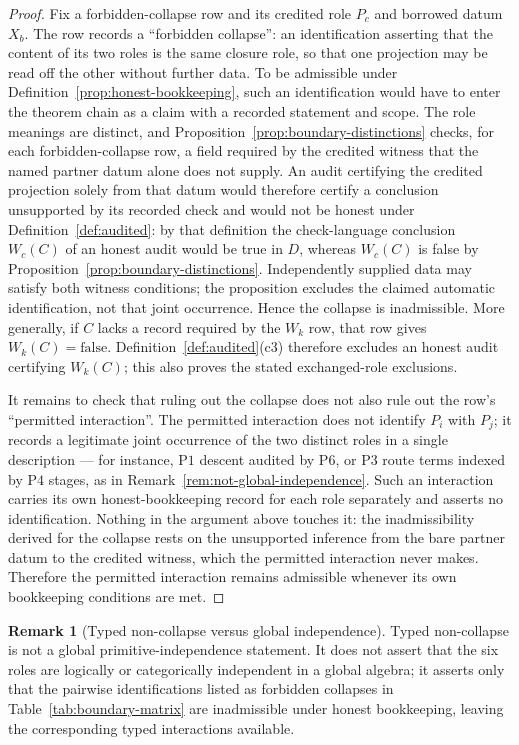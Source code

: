 \documentclass[11pt]{article}
\theoremstyle{definition}
\newtheorem{remark}[theorem]{Remark}
\newcommand{\Pone}{\ensuremath{\mathrm{P1}}}
\newcommand{\Pthree}{\ensuremath{\mathrm{P3}}}
\newcommand{\Pfour}{\ensuremath{\mathrm{P4}}}
\newcommand{\Psix}{\ensuremath{\mathrm{P6}}}
\begin{document}
\begin{proof}
Fix a forbidden-collapse row and its credited role \(P_c\) and borrowed datum \(X_b\). The row records a ``forbidden collapse'': an
identification asserting that the content of its two roles is the same
closure role, so that one
projection may be read off the other without further data. To be
admissible under Definition~\ref{prop:honest-bookkeeping}, such an
identification would have to enter the theorem chain as a claim with a
recorded statement and scope. The role meanings are distinct, and
Proposition~\ref{prop:boundary-distinctions} checks, for each
forbidden-collapse row, a field required by the credited witness that the
named partner datum alone does not supply. An audit certifying the credited
projection solely from that datum would therefore certify a conclusion
unsupported by its recorded check and would not be honest under
Definition~\ref{def:audited}: by that definition the check-language conclusion
\(W_c(C)\) of an honest audit would be true in \(D\), whereas \(W_c(C)\) is false by
Proposition~\ref{prop:boundary-distinctions}. Independently supplied data may satisfy both
witness conditions; the proposition excludes the claimed automatic
identification, not that joint occurrence. Hence the collapse is
inadmissible. More generally, if \(C\) lacks a record required by the \(W_k\) row, that row gives \(W_k(C)=\mathrm{false}\). Definition~\ref{def:audited}(c3) therefore excludes an honest audit certifying \(W_k(C)\); this also proves the stated exchanged-role exclusions.

It remains to check that ruling out the collapse does not also rule out
the row's ``permitted interaction''. The permitted interaction does not
identify \(P_i\) with \(P_j\); it records a legitimate joint occurrence
of the two distinct roles in a single description --- for instance,
\Pone{} descent audited by \Psix{}, or \Pthree{} route terms indexed by
\Pfour{} stages, as in Remark~\ref{rem:not-global-independence}. Such
an interaction carries its own honest-bookkeeping record for each role
separately and asserts no identification. Nothing in the argument above
touches it: the inadmissibility derived for the collapse rests on the unsupported
inference from the bare partner datum to the credited witness, which the
permitted interaction never makes. Therefore the permitted interaction remains admissible
whenever its own bookkeeping conditions are met.
\end{proof}

\begin{remark}[Typed non-collapse versus global independence]\label{rem:typed-non-collapse-vs-independence}
Typed non-collapse is not a global primitive-independence statement. It does not assert that the six roles are logically or
categorically independent in a global algebra; it asserts only that
the pairwise identifications listed as forbidden collapses in
Table~\ref{tab:boundary-matrix} are inadmissible under honest
bookkeeping, leaving the corresponding typed interactions available.
\end{remark}
\end{document}
